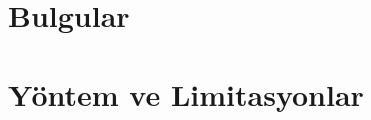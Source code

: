 \documentclass{article}
\newcommand{\institute}{
}
\newcommand{\protocolId}{
}
\newcommand{\summaryDate}{
}
\newcommand{\chipId}{
}
\newcommand{\chipPosition}{
}
\newcommand{\chipType}{
}
\newcommand{\canvasVersion}{
}
\begin{document}
\shorthandoff{=}

%
%
%
%


\section{Bulgular}


%

\section{Yöntem ve Limitasyonlar}
\end{document}
